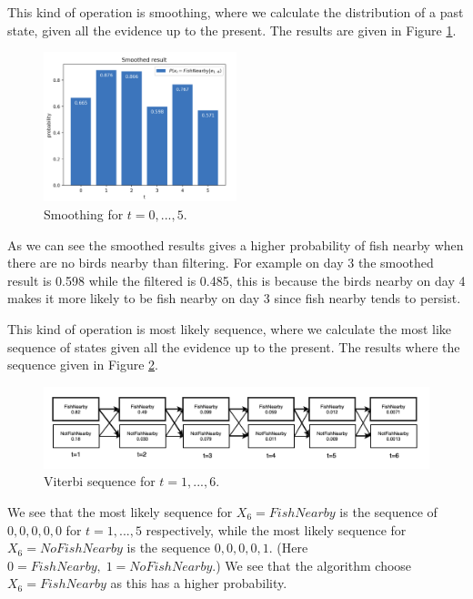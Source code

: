 \documentclass[11pt, a4paper, english]{NTNUoving}
\begin{document}
\begin{oppgave}
\begin{punkt}
    This kind of operation is smoothing, where we calculate the distribution of a past state, given all the evidence up to the present.
    The results are given in Figure \ref{fig:smoothing}.

    \begin{figure}[H]
        \centering
        \includegraphics[width=0.5\textwidth]{smoothing.png}
        \caption{Smoothing for $t = 0,...,5$.}
        \label{fig:smoothing}
    \end{figure}

    As we can see the smoothed results gives a higher probability of fish nearby when there are no birds nearby than filtering.
    For example on day 3 the smoothed result is 0.598 while the filtered is 0.485, this is because the birds nearby on day 4 makes it more
    likely to be fish nearby on day 3 since fish nearby tends to persist.
\end{punkt}

\begin{punkt}
    This kind of operation is most likely sequence, where we calculate the most like sequence of states given all the evidence up to the present.
    The results where the sequence given in Figure \ref{fig:viterbi}.

    \begin{figure}[H]
        \centering
        \includegraphics[width=1.0\textwidth]{viterbi.png}
        \caption{Viterbi sequence for $t = 1,...,6$.}
        \label{fig:viterbi}
    \end{figure}

    We see that the most likely sequence for $X_6 = FishNearby$ is the sequence of
    $0, 0, 0, 0, 0$ for $t=1,...,5$ respectively, while the most likely sequence for
    $X_6=NoFishNearby$ is the sequence $0, 0, 0, 0, 1$. (Here $0=FishNearby,\;1=NoFishNearby$.)
    We see that the algorithm choose $X_6 = FishNearby$ as this has a higher probability.
\end{punkt}

\end{oppgave}

\end{document}
